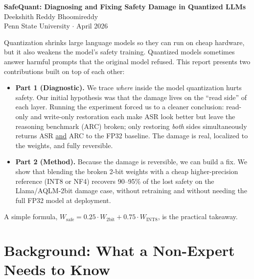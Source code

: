 \documentclass[11pt]{article}
\begin{document}
\begin{center}
{\LARGE \textbf{SafeQuant: Diagnosing and Fixing Safety Damage in Quantized LLMs}}\\[8pt]
{\large Deekshith Reddy Bhoomireddy}\\[4pt]
Penn State University \quad $\cdot$ \quad April 2026
\end{center}

\vspace{10pt}

\begin{tcolorbox}[colback=myblue!5, colframe=myblue, title=\textbf{Summary}]
Quantization shrinks large language models so they can run on cheap hardware, but it also weakens the model's safety training. Quantized models sometimes answer harmful prompts that the original model refused. This report presents two contributions built on top of each other:
\begin{itemize}
    \item \textbf{Part 1 (Diagnostic).} We trace \emph{where} inside the model quantization hurts safety. Our initial hypothesis was that the damage lives on the ``read side'' of each layer. Running the experiment forced us to a cleaner conclusion: read-only and write-only restoration each make ASR look better but leave the reasoning benchmark (ARC) broken; only restoring \emph{both} sides simultaneously returns ASR \underline{and} ARC to the FP32 baseline. The damage is real, localized to the weights, and fully reversible.
    \item \textbf{Part 2 (Method).} Because the damage is reversible, we can build a fix. We show that blending the broken 2-bit weights with a cheap higher-precision reference (INT8 or NF4) recovers 90--95\% of the lost safety on the Llama/AQLM-2bit damage case, without retraining and without needing the full FP32 model at deployment.
\end{itemize}
\noindent A simple formula, $W_{\text{safe}} = 0.25 \cdot W_{\text{2bit}} + 0.75 \cdot W_{\text{INT8}}$, is the practical takeaway.
\end{tcolorbox}

\tableofcontents
\newpage

\section{Background: What a Non-Expert Needs to Know}
\label{sec:bg}
\end{document}
